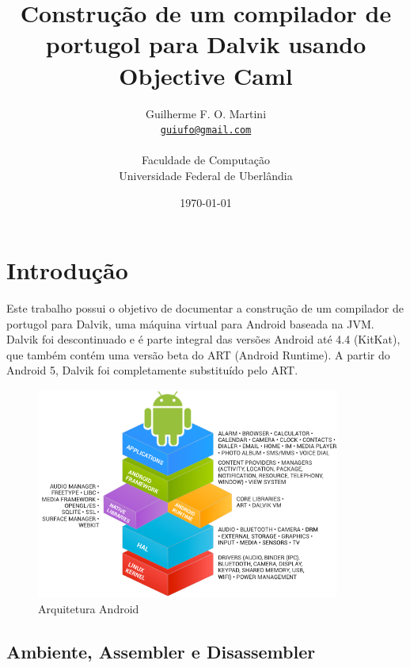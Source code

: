 \documentclass[12pt,a4paper,twoside]{report}
\title{Construção de um compilador de portugol para Dalvik usando Objective Caml}
\date{}
\author{Guilherme F. O. Martini \\
\texttt{\small \url{guiufo@gmail.com}}\\
\vspace{1cm} \\
Faculdade de Computação \\
Universidade Federal de Uberlândia
}
\date{\today}
\begin{document}
  \maketitle
\listoffigures            
\listoftables            
\lstlistoflistings

\tableofcontents    


\fancyhead[RE,LO]{\thesection}

\setlength{\parskip}{0.15in} %

\chapter{Introdução}
Este trabalho possui o objetivo de documentar a construção de um compilador
de portugol para Dalvik, uma máquina virtual para Android baseada na JVM.
Dalvik foi descontinuado e é parte integral das versões Android até 4.4 (KitKat),
que também contém uma versão beta do ART (Android Runtime).
A partir do Android 5, Dalvik foi completamente substituído pelo ART.

\begin{figure}[h]
	\centering
	\includegraphics[width=10cm]{imagens/arquitetura-android}
	\caption{Arquitetura Android}
	\label{fig:arquitetura-android}
\end{figure}

\section{Ambiente, Assembler e Disassembler}
\end{document}
